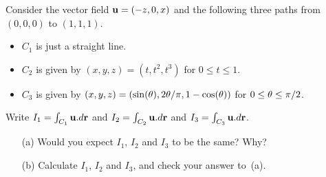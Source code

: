 \documentclass[a4paper]{amsart}
\begin{document}
\begin{exercise}
 Consider the vector field $\mathbf{u}=(-z,0,x)$ and the following three
 paths from $(0,0,0)$ to $(1,1,1)$.
 \begin{itemize}
  \item $C_1$ is just a straight line.
  \item $C_2$ is given by $(x,y,z)=(t,t^2,t^3)$ for
   $0\leq t\leq 1$.
  \item $C_3$ is given by
   $(x,y,z)=(\sin(\theta),2\theta/\pi,1-\cos(\theta))$ for
   $0\leq\theta\leq\pi/2$. 
 \end{itemize}
 Write $I_1=\int_{C_1}\mathbf{u}.d\mathbf{r}$ and $I_2=\int_{C_2}\mathbf{u}.d\mathbf{r}$ and
 $I_3=\int_{C_3}\mathbf{u}.d\mathbf{r}$. 
 \begin{itemize}
  \item[(a)] Would you expect $I_1$, $I_2$ and $I_3$ to be the same?
   Why?
  \item[(b)] Calculate $I_1$, $I_2$ and $I_3$, and check your answer
   to~(a). 
 \end{itemize}
\end{exercise}
\end{document}

